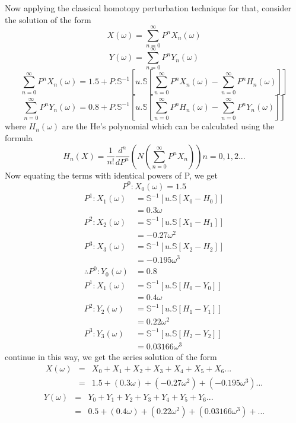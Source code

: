  Now applying the classical homotopy perturbation technique for that, consider the solution of the form
  \begin{equation*}
 X(\omega)=\sum_{n=0}^{\infty} P^{n}X_{n}(\omega)
 \end{equation*}
  \begin{equation*}
 Y(\omega)=\sum_{n=0}^{\infty} P^{n}Y_{n}(\omega)
 \end{equation*} 
 \begin{equation*}
  \sum_{n=0}^{\infty} P^{n}X_{n}(\omega)=1.5+P.\mathbb{S}^{-1}[ u.\mathbb{S}[ \sum_{n=0}^{\infty} P^{n}X_{n}(\omega)-\sum_{n=0}^{\infty} P^{n}H_{n}(\omega)]]
 \end{equation*}
 \begin{equation*}
  \sum_{n=0}^{\infty} P^{n}Y_{n}(\omega)=0.8+P.\mathbb{S}^{-1}[ u.\mathbb{S}[ \sum_{n=0}^{\infty} P^{n}H_{n}(\omega)-\sum_{n=0}^{\infty} P^{n}Y_{n}(\omega)]]
 \end{equation*}
 where $ H_{n}(\omega) $ are the He's polynomial which can be calculated using the formula 
 \begin{equation*}
{  H_{n}(X) = \frac{1}{n!}\frac{d^n}{dP^n}(N(\sum_{n=0}^{\infty} P^nX_{n}))}      n = 0,1,2...
 \end{equation*}
 Now equating the terms with identical powers of P, we get
 \begin{equation*}
 P^{0}:X_{0}(\omega)=1.5
 \end{equation*}
 \begin{align*}
 P^{1}:X_{1}(\omega)&=\mathbb{S}^{-1}[ u.\mathbb{S}[X_{0}-H_{0}]]\\
 &=0.3 \omega\\
 P^{2}:X_{2}(\omega)&=\mathbb{S}^{-1}[ u.\mathbb{S}[X_{1}-H_{1}]]\\
 &=-0.27\omega^2\\
 P^{3}:X_{3}(\omega)&=\mathbb{S}^{-1}[ u.\mathbb{S}[X_{2}-H_{2}]]\\
 &=-0.195\omega^3\\
\therefore P^{0}:Y_{0}(\omega)&=0.8\\
 P^{1}:X_{1}(\omega)&=\mathbb{S}^{-1}[ u.\mathbb{S}[H_{0}-Y_{0}]]\\
 &=0.4 \omega\\
 P^{2}:Y_{2}(\omega)&=\mathbb{S}^{-1}[ u.\mathbb{S}[H_{1}-Y_{1}]]\\
 &=0.22\omega^2\\
 P^{3}:Y_{3}(\omega)&=\mathbb{S}^{-1}[ u.\mathbb{S}[H_{2}-Y_{2}]]\\
 &=0.03166\omega^3
 \end{align*}
continue in this way, we get the series solution of the form
 \begin{eqnarray*}
 X(\omega)&=&X_{0}+X_{1}+X_{2}+X_{3}+X_{4}+X_{5}+X_{6}...\\
 &=&1.5+(0.3\omega)+(-0.27\omega^2)+(-0.195\omega^3)...
 \end{eqnarray*}
 \begin{eqnarray*}
 Y(\omega)&=&Y_{0}+Y_{1}+Y_{2}+Y_{3}+Y_{4}+Y_{5}+Y_{6}...\\
 &=&0.5+(0.4\omega)+(0.22\omega^2)+(0.03166\omega^3)+...
 \end{eqnarray*}

